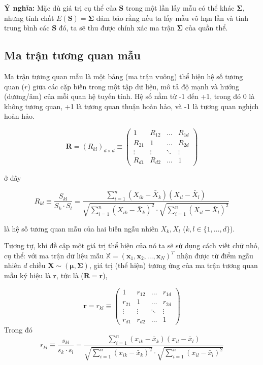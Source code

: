 \noindent \textbf{Ý nghĩa:} Mặc dù giá trị cụ thể của $\bm{S}$ trong một lần lấy mẫu có thể khác $\bm{\Sigma}$, nhưng tính chất $E(\bm{S}) = \bm{\Sigma}$ đảm bảo rằng nếu ta lấy mẫu vô hạn lần và tính trung bình các $\bm{S}$ đó, ta sẽ thu được chính xác ma trận $\bm{\Sigma}$ của quần thể.

\subsection{Ma trận tương quan mẫu}

Ma trận tương quan mẫu là một bảng (ma trận vuông) thể hiện hệ số tương quan ($r$) giữa các cặp biến trong một tập dữ liệu, mô tả độ mạnh và hướng (dương/âm) của mỗi quan hệ tuyến tính. Hệ số nằm từ -1 đến +1, trong đó 0 là không tương quan, +1 là tương quan thuận hoàn hảo, và -1 là tương quan nghịch hoàn hảo.

\[
\bm{R} = (R_{kl})_{d \times d} \equiv 
\begin{pmatrix}
1 & R_{12} & \dots & R_{1d} \\
R_{21} & 1 & \dots & R_{2d} \\
\vdots & \vdots & \ddots & \vdots \\
R_{d1} & R_{d2} & \dots & 1
\end{pmatrix}
\]

\noindent ở đây

\[
R_{kl} \equiv \frac{S_{kl}}{S_k \cdot S_l} = \frac{\sum_{i=1}^n (X_{ik} - \bar{X}_k)(X_{il} - \bar{X}_l)}{\sqrt{\sum_{i=1}^n (X_{ik} - \bar{X}_k)^2} \cdot \sqrt{\sum_{i=1}^n (X_{il} - \bar{X}_l)^2}}
\]

\noindent là hệ số tương quan mẫu của hai biến ngẫu nhiên $X_k, X_l$ ($k, l \in \{1, \dots, d\}$).

Tương tự, khi đề cập một giá trị thể hiện của nó ta sẽ sử dụng cách viết chữ nhỏ, cụ thể: với ma trận dữ liệu mẫu $\mathbb{X} = (\bm{x}_1, \bm{x}_2, \dots, \bm{x}_N)^T$ nhận được từ điểm ngẫu nhiên $d$ chiều $\bm{X} \sim (\bm{\mu}, \bm{\Sigma})$, giá trị (thể hiện) tương ứng của ma trận tương quan mẫu ký hiệu là $\bm{r}$, tức là ($\bm{R} = \bm{r}$),

\[
\bm{r} = r_{kl} \equiv 
\begin{pmatrix}
1 & r_{12} & \dots & r_{1d} \\
r_{21} & 1 & \dots & r_{2d} \\
\vdots & \vdots & \ddots & \vdots \\
r_{d1} & r_{d2} & \dots & 1
\end{pmatrix}
\]
Trong đó
\[
r_{kl} \equiv \frac{s_{kl}}{s_k \cdot s_l} = \frac{\sum_{i=1}^n (x_{ik} - \bar{x}_k)(x_{il} - \bar{x}_l)}{\sqrt{\sum_{i=1}^n (x_{ik} - \bar{x}_k)^2} \cdot \sqrt{\sum_{i=1}^n (x_{il} - \bar{x}_l)^2}}
\]

